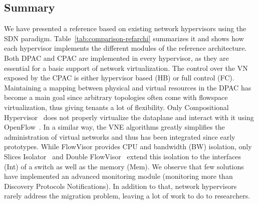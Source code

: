 \subsection{Summary}
We have presented a reference based on existing network hypervisors using the SDN paradigm.
Table~\ref{tab:comparison-refarchi} summarizes it and shows how each hypervisor implements the different modules of the reference architecture.
Both DPAC and CPAC are implemented in every hypervisor, as they are essential for a basic support of network virtualization.
The control over the VN exposed by the CPAC is either hypervisor based (HB) or full control (FC).
Maintaining a mapping between physical and virtual resources in the DPAC has become a main goal since arbitrary topologies often come with flowspace virtualization, thus giving tenants a lot of flexibility.
Only Compositional Hypervisor~\cite{CompositionalHypervisor-Jin2014} does not properly virtualize the dataplane and interact with it using OpenFlow~\cite{Openflow-McKeown2008}.
In a similar way, the VNE algorithms greatly simplifies the administration of virtual networks and thus has been integrated since early prototypes.
While FlowVisor provides CPU and bandwidth (BW) isolation, only Slices Isolator~\cite{SlicesIsolator-El-Azzab2011} and Double FlowVisor~\cite{DoubleFV-Yin2013} extend this isolation to the interfaces (Int) of a switch as well as the memory (Mem).
We observe that few solutions have implemented an advanced monitoring module (\ie monitoring more than Discovery Protocols Notifications).
In addition to that, network hypervisors rarely address the migration problem, leaving a lot of work to do to researchers.



